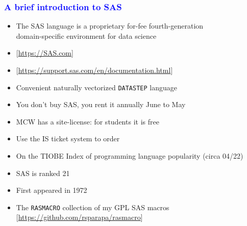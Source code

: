 \documentclass[11pt,pdftex,dvipsnames,usenames]{beamer}
\begin{document}
\begin{frame}[fragile]\frametitle{\bf\textcolor{blue}{A brief introduction to SAS}}

\begin{itemize}
\item The SAS language is a proprietary for-fee fourth-generation\\ domain-specific environment for data science
\item \textcolor{PineGreen}{[\href{https://SAS.com}{https://SAS.com}]}
\item \textcolor{PineGreen}{[\href{https://support.sas.com/en/documentation.html}{https://support.sas.com/en/documentation.html}]}
\item Convenient naturally vectorized \texttt{DATASTEP} language 
\item You don't buy SAS, you rent it annually June to May
\item MCW has a site-license: for students it is free
\item Use the IS ticket system to order
\item On the TIOBE Index of programming language popularity (circa 04/22)
\item SAS is ranked 21 
\item First appeared in 1972
\item The \texttt{RASMACRO} collection of my GPL SAS macros 
\textcolor{PineGreen}{[\href{https://github.com/rsparapa/rasmacro}{https://github.com/rsparapa/rasmacro}]}
\end{itemize}

\end{frame}
\end{document}
